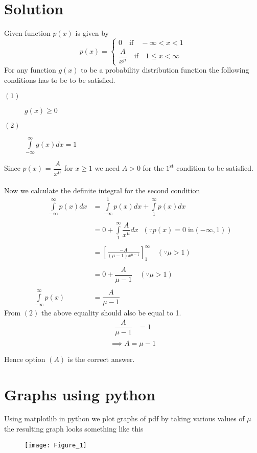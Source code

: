 \documentclass[journal,12pt,twocolumn]{IEEEtran}
\providecommand{\brak}[1]{\ensuremath{\left(#1\right)}}
\begin{document}
\section*{Solution}
Given function $p\brak{x}$ is given by
\begin{equation}
\nonumber p\brak{x}=
\begin{cases}
0 \quad \text{if}\quad -\infty<x<1\\
\dfrac{A}{x^\mu} \quad \text{if} \quad 1\leq x < \infty
\end{cases}
\end{equation}
For any function $g\brak{x}$ to be a probability distribution function the following conditions has to be to be satisfied.\\
\begin{description}
\item[$\brak{1}$] $g\brak{x} \geq 0$\\
\item[$\brak{2}$] $\int\limits_{-\infty}^{\infty}g\brak{x}dx = 1$
\end{description}
Since  $p\brak{x}$ = $\dfrac{A}{x^\mu}$ for $x\geq1$ we need $A>0$ for the $1^\text{st}$ condition to be satisfied.\\\\
Now we calculate the definite integral for the second condition
\begin{align}
\nonumber   \qquad \int\limits_{-\infty}^{\infty}p\brak{x}dx &=\int\limits_{-\infty}^{1}p\brak{x}dx + \int\limits_{1}^{\infty}p\brak{x}dx   \\\nonumber\\
\nonumber &= 0 + \int\limits_{1}^{\infty}\dfrac{A}{x^\mu}dx \:\:\, \brak{\because p\brak{x} = 0 \;\text{in} \brak{-\infty,1}}\\\nonumber\\
\nonumber  &= \left[\frac{-A}{\brak{\mu-1}x^{\mu-1}}\right]_{1}^{\infty}  \quad \brak{\because \mu > 1}\\\nonumber\\
\nonumber  &= 0 + \dfrac{A}{\mu-1}  \quad \brak{\because \mu > 1}\\\nonumber\\
\nonumber \int\limits_{-\infty}^{\infty}p\brak{x} &= \dfrac{A}{\mu-1}
\end{align}
From $\brak{2}$ the above equality should also  be equal to 1. 
\begin{align}
\nonumber \dfrac{A}{\mu-1} &=1\\\nonumber
\end{align}
$$\implies A = \mu-1$$

Hence option $\brak{A}$ is the correct answer.
\newpage
\section*{Graphs using python}
Using  matplotlib in python we plot graphs of pdf by taking various values of $\mu$ the resulting graph looks something like this
\begin{figure}[h]
\texttt{[image: Figure\_1]}
\end{figure}
\end{document}
